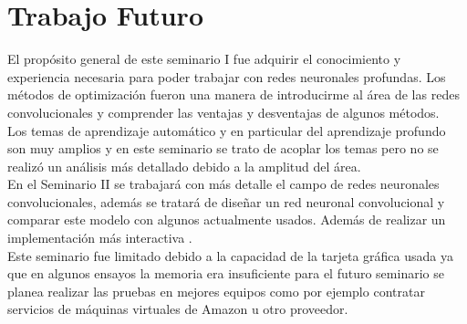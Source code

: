 \section{Trabajo Futuro}
El propósito general de este seminario I fue adquirir el conocimiento y experiencia necesaria para poder trabajar con redes neuronales profundas. Los métodos de optimización fueron una manera de introducirme al área de las redes convolucionales y comprender las ventajas y desventajas de algunos métodos. \\
Los temas de aprendizaje automático y en particular del aprendizaje profundo son muy amplios y en este seminario se trato de acoplar los temas pero no se realizó un análisis más detallado debido a la amplitud del área. \\
En el Seminario II se trabajará con más detalle el campo de redes neuronales convolucionales, además se tratará de diseñar un red neuronal convolucional y comparar este modelo con algunos actualmente usados. Además de realizar un implementación más interactiva .\\ Este seminario fue limitado debido a la capacidad de la tarjeta gráfica usada ya que en algunos ensayos la memoria era insuficiente para el futuro seminario se planea realizar las pruebas en mejores equipos como por ejemplo contratar servicios de máquinas virtuales de Amazon u otro proveedor.



